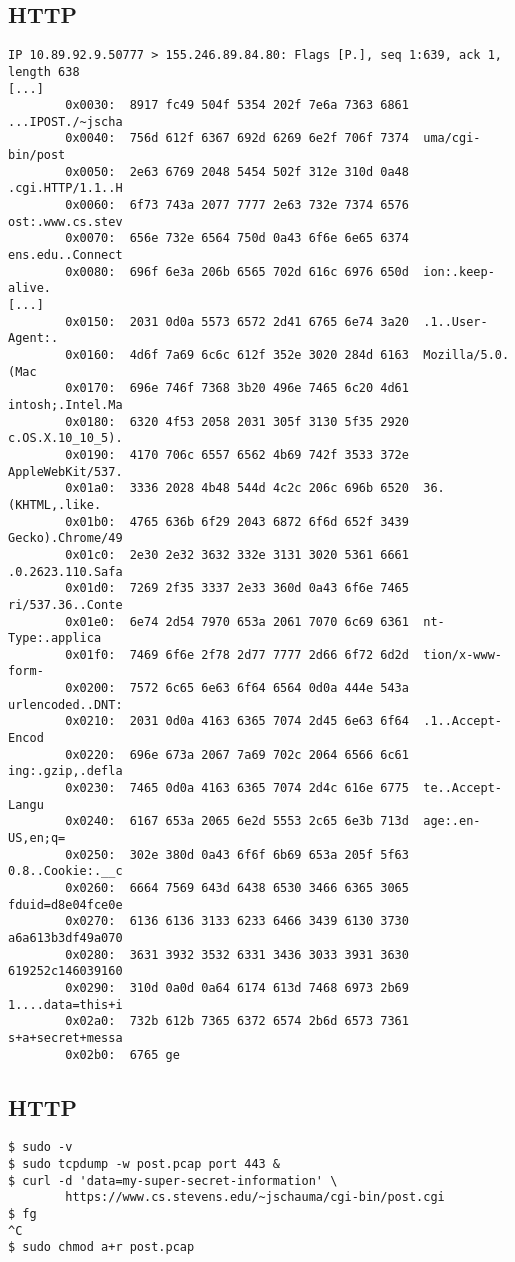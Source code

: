 \documentclass[xga]{xdvislides}
\begin{document}
\subsection{HTTP}
\small
\begin{verbatim}
IP 10.89.92.9.50777 > 155.246.89.84.80: Flags [P.], seq 1:639, ack 1, length 638
[...]
        0x0030:  8917 fc49 504f 5354 202f 7e6a 7363 6861  ...IPOST./~jscha
        0x0040:  756d 612f 6367 692d 6269 6e2f 706f 7374  uma/cgi-bin/post
        0x0050:  2e63 6769 2048 5454 502f 312e 310d 0a48  .cgi.HTTP/1.1..H
        0x0060:  6f73 743a 2077 7777 2e63 732e 7374 6576  ost:.www.cs.stev
        0x0070:  656e 732e 6564 750d 0a43 6f6e 6e65 6374  ens.edu..Connect
        0x0080:  696f 6e3a 206b 6565 702d 616c 6976 650d  ion:.keep-alive.
[...]
        0x0150:  2031 0d0a 5573 6572 2d41 6765 6e74 3a20  .1..User-Agent:.
        0x0160:  4d6f 7a69 6c6c 612f 352e 3020 284d 6163  Mozilla/5.0.(Mac
        0x0170:  696e 746f 7368 3b20 496e 7465 6c20 4d61  intosh;.Intel.Ma
        0x0180:  6320 4f53 2058 2031 305f 3130 5f35 2920  c.OS.X.10_10_5).
        0x0190:  4170 706c 6557 6562 4b69 742f 3533 372e  AppleWebKit/537.
        0x01a0:  3336 2028 4b48 544d 4c2c 206c 696b 6520  36.(KHTML,.like.
        0x01b0:  4765 636b 6f29 2043 6872 6f6d 652f 3439  Gecko).Chrome/49
        0x01c0:  2e30 2e32 3632 332e 3131 3020 5361 6661  .0.2623.110.Safa
        0x01d0:  7269 2f35 3337 2e33 360d 0a43 6f6e 7465  ri/537.36..Conte
        0x01e0:  6e74 2d54 7970 653a 2061 7070 6c69 6361  nt-Type:.applica
        0x01f0:  7469 6f6e 2f78 2d77 7777 2d66 6f72 6d2d  tion/x-www-form-
        0x0200:  7572 6c65 6e63 6f64 6564 0d0a 444e 543a  urlencoded..DNT:
        0x0210:  2031 0d0a 4163 6365 7074 2d45 6e63 6f64  .1..Accept-Encod
        0x0220:  696e 673a 2067 7a69 702c 2064 6566 6c61  ing:.gzip,.defla
        0x0230:  7465 0d0a 4163 6365 7074 2d4c 616e 6775  te..Accept-Langu
        0x0240:  6167 653a 2065 6e2d 5553 2c65 6e3b 713d  age:.en-US,en;q=
        0x0250:  302e 380d 0a43 6f6f 6b69 653a 205f 5f63  0.8..Cookie:.__c
        0x0260:  6664 7569 643d 6438 6530 3466 6365 3065  fduid=d8e04fce0e
        0x0270:  6136 6136 3133 6233 6466 3439 6130 3730  a6a613b3df49a070
        0x0280:  3631 3932 3532 6331 3436 3033 3931 3630  619252c146039160
        0x0290:  310d 0a0d 0a64 6174 613d 7468 6973 2b69  1....data=this+i
        0x02a0:  732b 612b 7365 6372 6574 2b6d 6573 7361  s+a+secret+messa
        0x02b0:  6765 ge
\end{verbatim}
\Normalsize

\subsection{HTTP}
\begin{verbatim}
$ sudo -v
$ sudo tcpdump -w post.pcap port 443 &
$ curl -d 'data=my-super-secret-information' \
        https://www.cs.stevens.edu/~jschauma/cgi-bin/post.cgi
$ fg
^C
$ sudo chmod a+r post.pcap
\end{verbatim}
\end{document}
